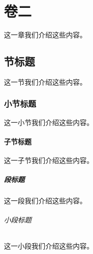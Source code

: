 
\chapter{卷二}这一章我们介绍这些内容。
\section{节标题}这一节我们介绍这些内容。
\subsection{小节标题}这一小节我们介绍这些内容。
\subsubsection{子节标题}这一子节我们介绍这些内容。
\paragraph{段标题}这一段我们介绍这些内容。
\subparagraph{小段标题}这一小段我们介绍这些内容。
